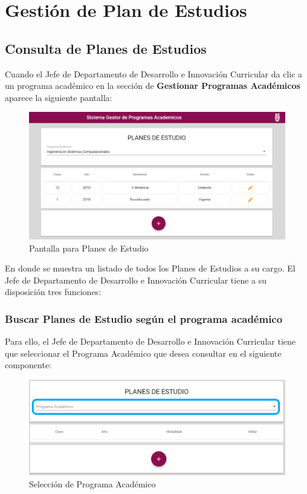 
\section{Gestión de Plan de Estudios}
\subsection{Consulta de Planes de Estudios}
Cuando el Jefe de Departamento de Desarrollo e Innovación Curricular da clic a un programa académico en la sección de \textbf{Gestionar Programas Académicos} aparece la siguiente pantalla:


\begin{figure}[H]
	\centering
	\hypertarget{consultarPE}{\includegraphics[width=0.7\linewidth]{images/SP4-GPE/consultar}}
	\caption{Pantalla para Planes de Estudio}
	\label{consultarPE}
\end{figure}

En donde se muestra un listado de todos los Planes de Estudios a su cargo. El Jefe de Departamento de Desarrollo e Innovación Curricular tiene a su disposición tres funciones:

\subsubsection{Buscar Planes de Estudio según el programa académico}

Para ello, el Jefe de Departamento de Desarrollo e Innovación Curricular tiene que seleccionar el Programa Académico que desea consultar en el siguiente componente:

\begin{figure}[H]
	\centering
	\hypertarget{academico}{\includegraphics[width=0.7\linewidth]{images/SP4-GPE/programa}}
	\caption{Selección de Programa Académico}
	\label{academico}
\end{figure}

